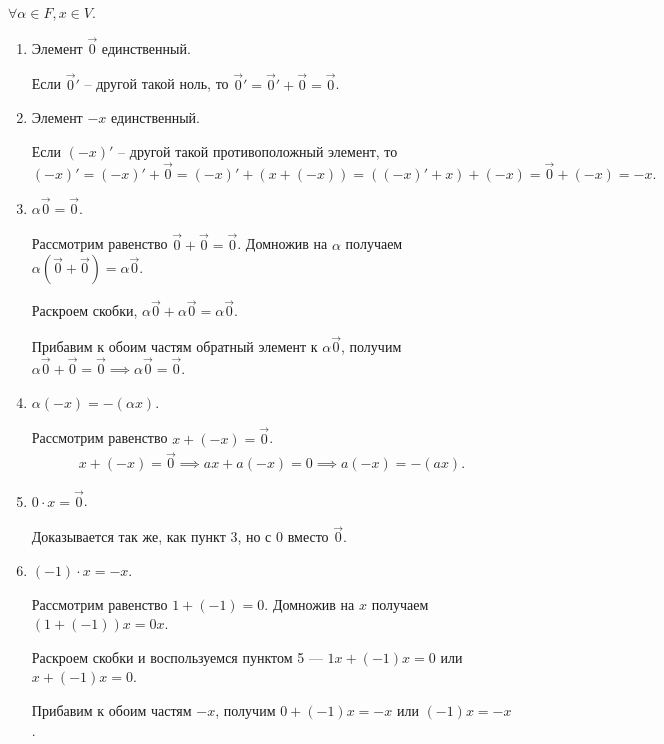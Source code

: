 $\forall \alpha \in F, x \in V$.
\begin{enumerate}
\item Элемент $\overrightarrow{0}$ единственный.

    Если $\overrightarrow{0}'$ -- другой такой ноль, то $\overrightarrow{0}' = \overrightarrow{0}' + \overrightarrow{0} = \overrightarrow{0}$.

\item Элемент $-x$ единственный.

    Если $(-x)'$ -- другой такой противоположный элемент, то
    \begin{equation*}
        (-x)' = (-x)' + \overrightarrow{0} = (-x)' + (x + (-x)) = ((-x)' + x) + (-x) = \overrightarrow{0} + (-x) = -x
    .\end{equation*}

\item $\alpha \overrightarrow{0} = \overrightarrow{0}$.

    \newcommand{\zr}{\overrightarrow{0}}
    Рассмотрим равенство $\zr + \zr = \zr$. Домножив на $\alpha$ получаем $\alpha(\zr + \zr) = \alpha\zr$.

    Раскроем скобки, $\alpha\zr + \alpha\zr = \alpha\zr$.

    Прибавим к обоим частям обратный элемент к $\alpha\zr$, получим $\alpha\zr + \zr = \zr \implies \alpha\zr = \zr$.

\item $\alpha (-x) = -(\alpha x)$.

    Рассмотрим равенство $x + (-x) = \overrightarrow{0}$.
    \begin{align*}
        x + (-x) = \overrightarrow{0} \implies ax + a(-x) = 0 \implies a(-x) = -(ax)
    .\end{align*}

\item $0 \cdot x = \overrightarrow{0}$.

    Доказывается так же, как пункт 3, но с 0 вместо $\zr$.

\item $(-1) \cdot x = -x$.

    Рассмотрим равенство $1 + (-1) = 0$. Домножив на $x$ получаем $(1 + (-1))x = 0x$.

    Раскроем скобки и воспользуемся пунктом 5 --- $1x + (-1)x = 0$ или $x + (-1)x = 0$.

    Прибавим к обоим частям $-x$, получим $0 + (-1)x = -x$ или $(-1)x = -x$.

\end{enumerate}


